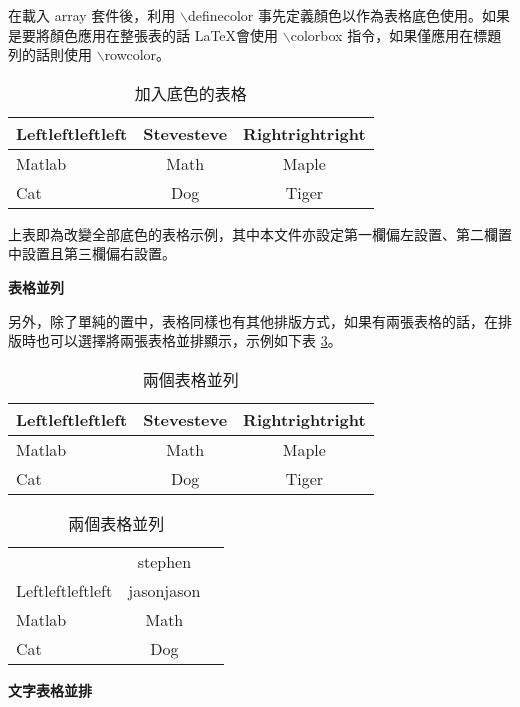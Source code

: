 在載入 array 套件後，利用 {\A $\backslash$definecolor} 事先定義顏色以作為表格底色使用。如果是要將顏色應用在整張表的話 \LaTeX 會使用 {\A $\backslash$colorbox} 指令，如果僅應用在標題列的話則使用 {\A $\backslash$rowcolor}。

\begin{table}[H] 
  \centering
  \extrarowheight=6pt
  \caption{加入底色的表格} \label{tb:basic_row_color}
  \colorbox{slight}{
  \begin{tabular}{lcc} 
  \hline
    Leftleftleftleft	& Stevesteve	& Rightrightright \\\hline  
    Matlab	& Math     	& Maple		\\\hline
    Cat 	& Dog    	& Tiger		\\\hline
  \end{tabular}
  }
\end{table}


上表即為改變全部底色的表格示例，其中本文件亦設定第一欄偏左設置、第二欄置中設置且第三欄偏右設置。

\textbf{表格並列}

另外，除了單純的置中，表格同樣也有其他排版方式，如果有兩張表格的話，在排版時也可以選擇將兩張表格並排顯示，示例如下表 \ref{tb:basic_two_table}。

  \begin{table}[H]
    \centering
    \caption{兩個表格並列}\label{tb:basic_two_table}
    \renewcommand{\arraystretch}{1.8}%
    \colorbox{beaublue}{\begin{tabular}{lcc}
    \hline
    Leftleftleftleft	& Stevesteve	& Rightrightright \\\hline  
    Matlab	& Math     	& Maple		\\\hline
    Cat 	& Dog    	& Tiger		\\\hline
    \end{tabular}}\hspace{10pt}
    \begin{tabular}{lcc}
    \hline \rowcolor{beige}
                   	& stephen \\[-2pt]\rowcolor{beige}
    Leftleftleftleft & jasonjason \\\hline  
    Matlab	& Math     \\\hline
    Cat 	& Dog    	\\\hline
    \end{tabular}
  \end{table}
  
\textbf{文字表格並排}
  

